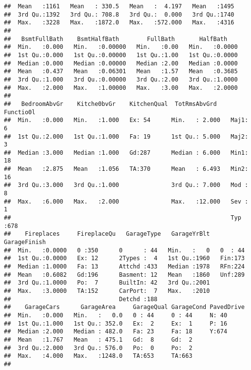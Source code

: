 \documentclass[]{article}
\begin{document}
\begin{verbatim}
##  Mean   :1161   Mean   : 330.5   Mean   :  4.197   Mean   :1495  
##  3rd Qu.:1392   3rd Qu.: 708.8   3rd Qu.:  0.000   3rd Qu.:1740  
##  Max.   :3228   Max.   :1872.0   Max.   :572.000   Max.   :4316  
##                                                                  
##   BsmtFullBath    BsmtHalfBath        FullBath       HalfBath     
##  Min.   :0.000   Min.   :0.00000   Min.   :0.00   Min.   :0.0000  
##  1st Qu.:0.000   1st Qu.:0.00000   1st Qu.:1.00   1st Qu.:0.0000  
##  Median :0.000   Median :0.00000   Median :2.00   Median :0.0000  
##  Mean   :0.437   Mean   :0.06301   Mean   :1.57   Mean   :0.3685  
##  3rd Qu.:1.000   3rd Qu.:0.00000   3rd Qu.:2.00   3rd Qu.:1.0000  
##  Max.   :2.000   Max.   :1.00000   Max.   :3.00   Max.   :2.0000  
##                                                                   
##   BedroomAbvGr    Kitche0bvGr    KitchenQual  TotRmsAbvGrd    Functio0l 
##  Min.   :0.000   Min.   :1.000   Ex: 54      Min.   : 2.000   Maj1:  6  
##  1st Qu.:2.000   1st Qu.:1.000   Fa: 19      1st Qu.: 5.000   Maj2:  3  
##  Median :3.000   Median :1.000   Gd:287      Median : 6.000   Min1: 18  
##  Mean   :2.875   Mean   :1.056   TA:370      Mean   : 6.493   Min2: 16  
##  3rd Qu.:3.000   3rd Qu.:1.000               3rd Qu.: 7.000   Mod :  8  
##  Max.   :6.000   Max.   :2.000               Max.   :12.000   Sev :  1  
##                                                               Typ :678  
##    Fireplaces     FireplaceQu   GarageType   GarageYrBlt   GarageFinish
##  Min.   :0.0000   0 :350      0      : 44   Min.   :   0   0  : 44     
##  1st Qu.:0.0000   Ex: 12      2Types :  4   1st Qu.:1960   Fin:173     
##  Median :1.0000   Fa: 13      Attchd :433   Median :1978   RFn:224     
##  Mean   :0.6082   Gd:196      Basment: 12   Mean   :1860   Unf:289     
##  3rd Qu.:1.0000   Po:  7      BuiltIn: 42   3rd Qu.:2001               
##  Max.   :3.0000   TA:152      CarPort:  7   Max.   :2010               
##                               Detchd :188                              
##    GarageCars      GarageArea     GarageQual GarageCond PavedDrive
##  Min.   :0.000   Min.   :   0.0   0 : 44     0 : 44     N: 40     
##  1st Qu.:1.000   1st Qu.: 352.0   Ex:  2     Ex:  1     P: 16     
##  Median :2.000   Median : 482.0   Fa: 23     Fa: 18     Y:674     
##  Mean   :1.767   Mean   : 475.1   Gd:  8     Gd:  2               
##  3rd Qu.:2.000   3rd Qu.: 576.0   Po:  0     Po:  2               
##  Max.   :4.000   Max.   :1248.0   TA:653     TA:663               
##                                                                   

\end{verbatim}
\end{document}
